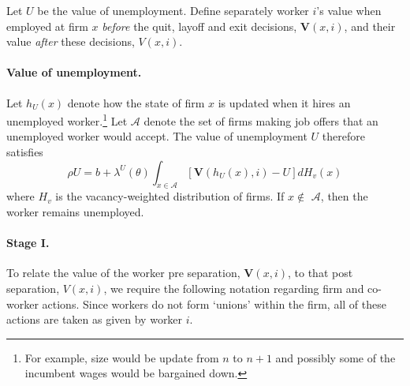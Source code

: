 Let $U$ be the value of unemployment. Define separately worker $i$'s value when employed at firm $x$
\emph{before} the quit, layoff and exit decisions, $\bm{V}%
\left(x,i\right) $, and their value \emph{after} these decisions, $V\left(
x,i\right)$.

\paragraph{Value of unemployment.}

Let $h_{U}\left( x\right)$ denote how the state of firm $x$ is updated when
it hires an unemployed worker.\footnote{%
For example, size would be update from $n$ to $n+1$ and possibly some of the
incumbent wages would be bargained down.} Let $\mathcal{A}$ denote the set
of firms making job offers that an unemployed worker would accept. The value of
unemployment $U$ therefore satisfies
\begin{equation*}
\rho U=b+\lambda^U(\theta)\int_{x\in \mathcal{A}}\left[ \bm{V}\left(
h_{U}\left( x\right) ,i\right) -U\right] dH_v\left(x\right)
\end{equation*}%
where $H_v$ is the vacancy-weighted distribution of firms. If $x\notin $ $%
\mathcal{A}$, then the worker remains unemployed.

\paragraph{Stage I.}

To relate the value of the worker pre separation, $\bm{V}(x,i)$, to that
post separation, $V(x,i)$, we require the following notation regarding firm
and co-worker actions. Since workers do not form `unions' within the firm,
all of these actions are taken as given by worker $i$.

